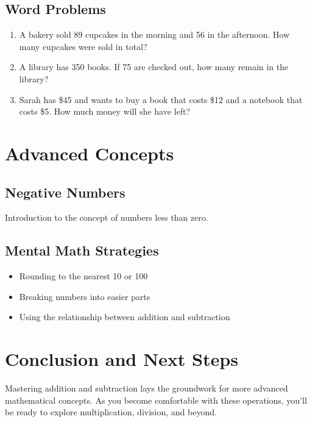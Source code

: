 \subsection{Word Problems}
\begin{enumerate}
    \item A bakery sold 89 cupcakes in the morning and 56 in the afternoon. How many cupcakes were sold in total?
    \item A library has 350 books. If 75 are checked out, how many remain in the library?
    \item Sarah has \$45 and wants to buy a book that costs \$12 and a notebook that costs \$5. How much money will she have left?
\end{enumerate}

\section{Advanced Concepts}
\subsection{Negative Numbers}
Introduction to the concept of numbers less than zero.

\begin{center}
\end{center}

\subsection{Mental Math Strategies}
\begin{itemize}
    \item Rounding to the nearest 10 or 100
    \item Breaking numbers into easier parts
    \item Using the relationship between addition and subtraction
\end{itemize}

\section{Conclusion and Next Steps}
Mastering addition and subtraction lays the groundwork for more advanced mathematical concepts. As you become comfortable with these operations, you'll be ready to explore multiplication, division, and beyond.

